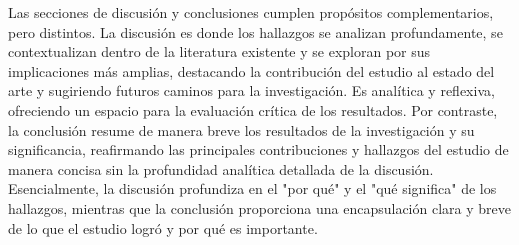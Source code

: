 Las secciones de discusión y conclusiones cumplen propósitos complementarios, pero distintos. La discusión es donde los hallazgos se analizan profundamente, se contextualizan dentro de la literatura existente y se exploran por sus implicaciones más amplias, destacando la contribución del estudio al estado del arte y sugiriendo futuros caminos para la investigación. Es analítica y reflexiva, ofreciendo un espacio para la evaluación crítica de los resultados. Por contraste, la conclusión resume de manera breve los resultados de la investigación y su significancia, reafirmando las principales contribuciones y hallazgos del estudio de manera concisa sin la profundidad analítica detallada de la discusión. Esencialmente, la discusión profundiza en el "por qué" y el "qué significa" de los hallazgos, mientras que la conclusión proporciona una encapsulación clara y breve de lo que el estudio logró y por qué es importante.





